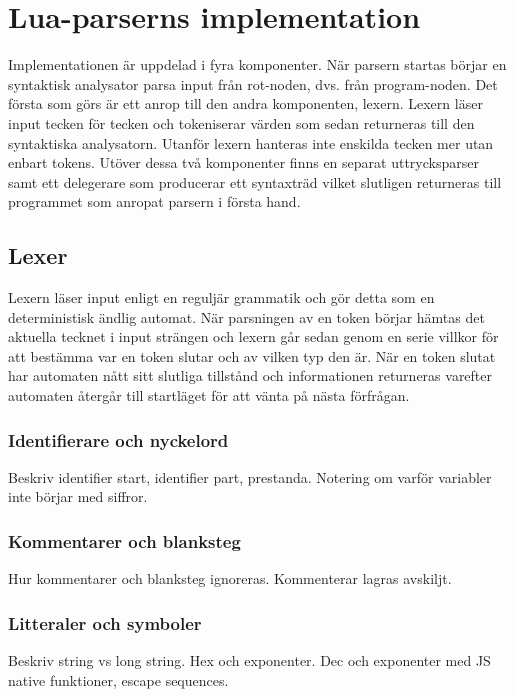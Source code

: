 \section{Lua-parserns implementation}

Implementationen är uppdelad i fyra komponenter. När parsern startas börjar
en syntaktisk analysator parsa input från rot-noden, dvs. från program-noden.
Det första som görs är ett anrop till den andra komponenten, lexern. Lexern
läser input tecken för tecken och tokeniserar värden som sedan returneras
till den syntaktiska analysatorn. Utanför lexern hanteras inte enskilda tecken
mer utan enbart tokens. Utöver dessa två komponenter finns en separat
uttrycksparser samt ett delegerare som producerar ett syntaxträd vilket
slutligen returneras till programmet som anropat parsern i första hand.

\subsection{Lexer}

Lexern läser input enligt en reguljär grammatik och gör detta som en
deterministisk ändlig automat. När parsningen av en token börjar hämtas det
aktuella tecknet i input strängen och lexern går sedan genom en serie villkor
för att bestämma var en token slutar och av vilken typ den är. När en
token slutat har automaten nått sitt slutliga tillstånd och informationen
returneras varefter automaten återgår till startläget för att vänta på nästa
förfrågan.

\subsubsection{Identifierare och nyckelord}

Beskriv identifier start, identifier part, prestanda. Notering om varför
variabler inte börjar med siffror.

\subsubsection{Kommentarer och blanksteg}

Hur kommentarer och blanksteg ignoreras. Kommenterar lagras avskiljt.

\subsubsection{Litteraler och symboler}

Beskriv string vs long string. Hex och exponenter. Dec och exponenter med JS
native funktioner, escape sequences.

